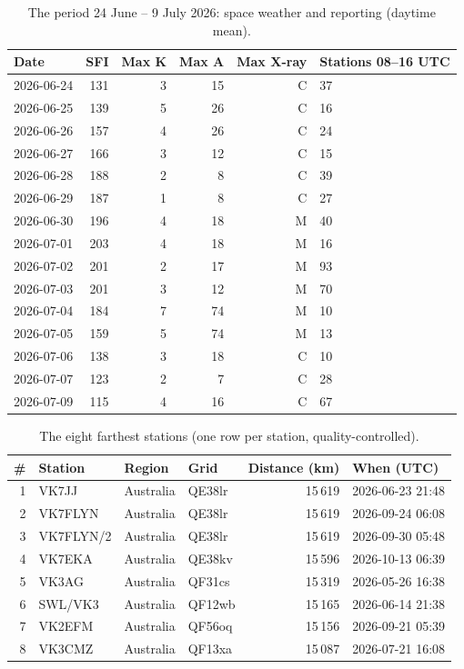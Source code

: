 \begin{table}[htbp]\centering\small
\caption{The period 24 June -- 9 July 2026: space weather and reporting (daytime mean).}\label{tab:case}
\begin{tabular}{lrrrrl}
\toprule
Date & SFI & Max K & Max A & Max X-ray & Stations 08--16 UTC \\
\midrule
2026-06-24 & 131 & 3 & 15 & C & 37 \\
2026-06-25 & 139 & 5 & 26 & C & 16 \\
2026-06-26 & 157 & 4 & 26 & C & 24 \\
2026-06-27 & 166 & 3 & 12 & C & 15 \\
2026-06-28 & 188 & 2 & 8 & C & 39 \\
2026-06-29 & 187 & 1 & 8 & C & 27 \\
2026-06-30 & 196 & 4 & 18 & M & 40 \\
2026-07-01 & 203 & 4 & 18 & M & 16 \\
2026-07-02 & 201 & 2 & 17 & M & 93 \\
2026-07-03 & 201 & 3 & 12 & M & 70 \\
2026-07-04 & 184 & 7 & 74 & M & 10 \\
2026-07-05 & 159 & 5 & 74 & M & 13 \\
2026-07-06 & 138 & 3 & 18 & C & 10 \\
2026-07-07 & 123 & 2 & 7 & C & 28 \\
2026-07-09 & 115 & 4 & 16 & C & 67 \\
\bottomrule
\end{tabular}
\end{table}

\begin{table}[htbp]\centering\small
\caption{The eight farthest stations (one row per station, quality-controlled).}\label{tab:records}
\begin{tabular}{rlllrl}
\toprule
\# & Station & Region & Grid & Distance (km) & When (UTC) \\
\midrule
1 & VK7JJ & Australia & QE38lr & 15\,619 & 2026-06-23 21:48 \\
2 & VK7FLYN & Australia & QE38lr & 15\,619 & 2026-09-24 06:08 \\
3 & VK7FLYN\slash 2 & Australia & QE38lr & 15\,619 & 2026-09-30 05:48 \\
4 & VK7EKA & Australia & QE38kv & 15\,596 & 2026-10-13 06:39 \\
5 & VK3AG & Australia & QF31cs & 15\,319 & 2026-05-26 16:38 \\
6 & SWL\slash VK3 & Australia & QF12wb & 15\,165 & 2026-06-14 21:38 \\
7 & VK2EFM & Australia & QF56oq & 15\,156 & 2026-09-21 05:39 \\
8 & VK3CMZ & Australia & QF13xa & 15\,087 & 2026-07-21 16:08 \\
\bottomrule
\end{tabular}
\end{table}
